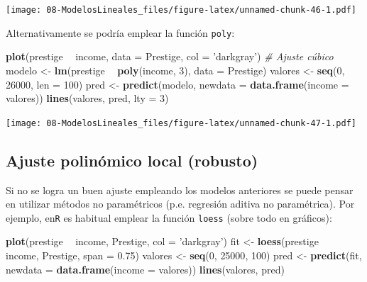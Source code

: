 \documentclass[]{book}
\newenvironment{Shaded}{\begin{snugshade}}{\end{snugshade}}
\newcommand{\KeywordTok}[1]{\textcolor[rgb]{0.13,0.29,0.53}{\textbf{#1}}}
\newcommand{\DataTypeTok}[1]{\textcolor[rgb]{0.13,0.29,0.53}{#1}}
\newcommand{\DecValTok}[1]{\textcolor[rgb]{0.00,0.00,0.81}{#1}}
\newcommand{\FloatTok}[1]{\textcolor[rgb]{0.00,0.00,0.81}{#1}}
\newcommand{\StringTok}[1]{\textcolor[rgb]{0.31,0.60,0.02}{#1}}
\newcommand{\CommentTok}[1]{\textcolor[rgb]{0.56,0.35,0.01}{\textit{#1}}}
\newcommand{\OperatorTok}[1]{\textcolor[rgb]{0.81,0.36,0.00}{\textbf{#1}}}
\newcommand{\NormalTok}[1]{#1}
\begin{document}
\texttt{[image: 08-ModelosLineales\_files/figure-latex/unnamed-chunk-46-1.pdf]}

Alternativamente se podría emplear la función \texttt{poly}:

\begin{Shaded}
\begin{Highlighting}[]
\KeywordTok{plot}\NormalTok{(prestige }\OperatorTok{~}\StringTok{ }\NormalTok{income, }\DataTypeTok{data =}\NormalTok{ Prestige, }\DataTypeTok{col =} \StringTok{'darkgray'}\NormalTok{)}
\CommentTok{# Ajuste cúbico}
\NormalTok{modelo <-}\StringTok{ }\KeywordTok{lm}\NormalTok{(prestige }\OperatorTok{~}\StringTok{ }\KeywordTok{poly}\NormalTok{(income, }\DecValTok{3}\NormalTok{), }\DataTypeTok{data =}\NormalTok{ Prestige)}
\NormalTok{valores <-}\StringTok{ }\KeywordTok{seq}\NormalTok{(}\DecValTok{0}\NormalTok{, }\DecValTok{26000}\NormalTok{, }\DataTypeTok{len =} \DecValTok{100}\NormalTok{)}
\NormalTok{pred <-}\StringTok{ }\KeywordTok{predict}\NormalTok{(modelo, }\DataTypeTok{newdata =} \KeywordTok{data.frame}\NormalTok{(}\DataTypeTok{income =}\NormalTok{ valores))}
\KeywordTok{lines}\NormalTok{(valores, pred, }\DataTypeTok{lty =} \DecValTok{3}\NormalTok{) }
\end{Highlighting}
\end{Shaded}

\texttt{[image: 08-ModelosLineales\_files/figure-latex/unnamed-chunk-47-1.pdf]}

\subsection{Ajuste polinómico local
(robusto)}\label{ajuste-polinomico-local-robusto}

Si no se logra un buen ajuste empleando los modelos anteriores se puede
pensar en utilizar métodos no paramétricos (p.e. regresión aditiva no
paramétrica). Por ejemplo, en\texttt{R} es habitual emplear la función
\texttt{loess} (sobre todo en gráficos):

\begin{Shaded}
\begin{Highlighting}[]
\KeywordTok{plot}\NormalTok{(prestige }\OperatorTok{~}\StringTok{ }\NormalTok{income, Prestige, }\DataTypeTok{col =} \StringTok{'darkgray'}\NormalTok{)}
\NormalTok{fit <-}\StringTok{ }\KeywordTok{loess}\NormalTok{(prestige }\OperatorTok{~}\StringTok{ }\NormalTok{income, Prestige, }\DataTypeTok{span =} \FloatTok{0.75}\NormalTok{)}
\NormalTok{valores <-}\StringTok{ }\KeywordTok{seq}\NormalTok{(}\DecValTok{0}\NormalTok{, }\DecValTok{25000}\NormalTok{, }\DecValTok{100}\NormalTok{)}
\NormalTok{pred <-}\StringTok{ }\KeywordTok{predict}\NormalTok{(fit, }\DataTypeTok{newdata =} \KeywordTok{data.frame}\NormalTok{(}\DataTypeTok{income =}\NormalTok{ valores))}
\KeywordTok{lines}\NormalTok{(valores, pred)}
\end{Highlighting}
\end{Shaded}
\end{document}
